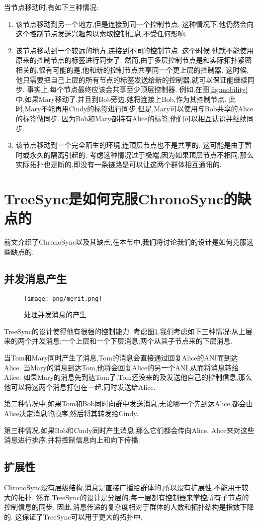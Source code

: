 当节点移动时,有如下三种情况:
\begin{enumerate}
  \item 该节点移动到另一个地方,但是连接到同一个控制节点.
  这种情况下,他仍然会向这个控制节点发送兴趣包以索取控制信息,不受任何影响.
  \item 该节点移动到一个较远的地方,连接到不同的控制节点.
  这个时候,他就不能使用原来的控制节点的标签进行同步了.
  然而,由于多层控制节点是和实际拓扑紧密相关的,很有可能的是,他和新的控制节点共享同一个更上层的控制器.
  这时候,他只需要把自己上层的所有节点的标签发送给新的控制器,就可以保证能继续同步.
  事实上,每个节点最终应该会共享至少顶层控制器.
  例如,在图\ref{fig:mobility}中,如果Mary移动了,并且到Bob旁边,她将连接上Bob,作为其控制节点.
  此时,Mary不能再用Cindy的标签进行同步,但是,Mary可以使用与Bob共享的Alice的标签做同步.
  因为Bob和Mary都持有Alice的标签,他们可以相互认识并继续同步.
  \item 该节点移动到一个完全陌生的环境,连顶层节点也不是共享的.
  这可能是由于暂时或永久的隔离引起的.
  考虑这种情况过于极端,因为如果顶层节点不相同,那么实际拓扑也是断的,即没有一条链路是可以让这两个群体相互通讯的.
\end{enumerate}

\section{TreeSync是如何克服ChronoSync的缺点的}

前文介绍了ChronoSync以及其缺点,在本节中,我们将讨论我们的设计是如何克服这些缺点的.

\subsection{并发消息产生}

\begin{figure}
\centering
\texttt{[image: png/merit.png]}
\caption{处理并发消息的产生}
\label{fig:merit}
\end{figure}

TreeSync的设计使得他有很强的控制能力.
考虑图\ref{fig:merit},我们考虑如下三种情况:从上层来的两个并发消息;一个上层和一个下层消息;两个从其子节点来的下层消息.

当Tom和Mary同时产生了消息,Tom的消息会直接通过回复Alice的ANI而到达Alice.
当Mary的消息到达Tom,他将会回复Alice的另一个ANI,从而将消息转给Alice.
如果Mary的消息先到达Tom了,Tom还没来的及发送他自己的控制信息,那么他可以将这两个消息打包在一起,同时发送给Alice.

第二种情况中,如果Tom和Bob同时向群中发送消息,无论哪一个先到达Alice,都会由Alice决定消息的顺序,然后将其转发给Cindy.

第三种情况,如果Bob和Cindy同时产生消息,那么它们都会传向Alice.
Alice来对这些消息进行排序,并将控制信息向上和向下传播.

\subsection{扩展性}

ChronoSync没有层级结构,消息是直接广播给群体的,所以没有扩展性,不能用于较大的拓扑.
然而,TreeSync的设计是分层的,每一层都有控制器来掌控所有子节点的控制信息的同步.
因此,消息传递的复杂度相对于群体的人数和拓扑结构是指数下降的.
这保证了TreeSync可以用于更大的拓扑中.
